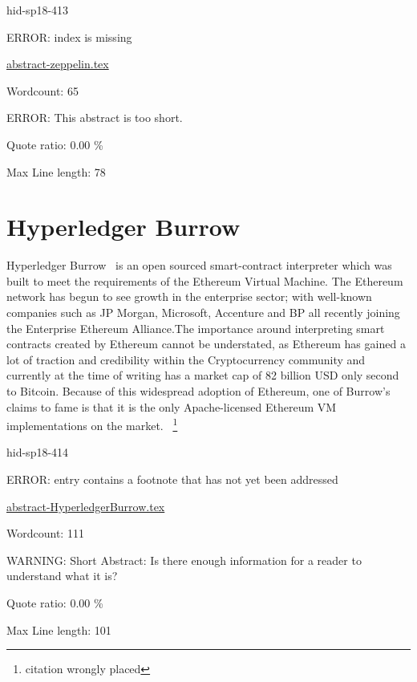 \begin{IU}

hid-sp18-413

ERROR: index is missing

\href{https://github.com/cloudmesh-community/hid-sp18-413/blob/master//technology/abstract-zeppelin.tex}{abstract-zeppelin.tex}

 

Wordcount: 65

ERROR: This abstract is too short.


Quote ratio: 0.00 \%
 
Max Line length: 78
\end{IU}

\section{Hyperledger Burrow}

Hyperledger Burrow~\cite{hid-sp18-414-Behlendorf} is an open sourced smart-contract interpreter which
was built to meet the requirements of the Ethereum Virtual
Machine. The Ethereum network has begun to see growth in the
enterprise sector; with well-known companies such as JP Morgan,
Microsoft, Accenture and BP all recently joining the Enterprise
Ethereum Alliance.The importance around interpreting
smart contracts created by Ethereum cannot be understated, as Ethereum
has gained a lot of traction and credibility within the Cryptocurrency
community and currently at the time of writing has a market cap of 82
billion USD only second to Bitcoin. Because of this widespread
adoption of Ethereum, one of Burrow’s claims to fame is that it is the
only Apache-licensed Ethereum VM implementations on the
market.~\cite{hid-sp18-414-Hyperledger_Burrow}
\footnote{citation wrongly placed}



\begin{IU}

hid-sp18-414

ERROR: entry contains a footnote that has not yet been addressed

\href{https://github.com/cloudmesh-community/hid-sp18-414/blob/master//technology/abstract-HyperledgerBurrow.tex}{abstract-HyperledgerBurrow.tex}

 

Wordcount: 111

WARNING: Short Abstract: Is there enough information for a reader to understand what it is?


Quote ratio: 0.00 \%
 
Max Line length: 101
\end{IU}

